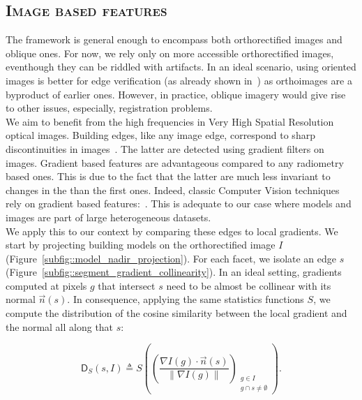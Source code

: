     \subsection{\textsc{Image based features}}
        \label{subsec::learned_evaluation::baseline::image}
        The framework is general enough to encompass both orthorectified images and oblique ones.
        For now, we rely only on more accessible orthorectified images, eventhough they can be riddled with artifacts.
        In an ideal scenario, using oriented images is better for edge verification (as already shown in~\parencite{michelin2013quality}) as orthoimages are a byproduct of earlier ones.
        However, in practice, oblique imagery would give rise to other issues, especially, registration problems.\\

        We aim to benefit from the high frequencies in Very High Spatial Resolution optical images.
        Building edges, like any image edge, correspond to sharp discontinuities in images~\parencite{ortner2007building}.
        The latter are detected using gradient filters on images.
        Gradient based features are advantageous compared to any radiometry based ones.
        This is due to the fact that the latter are much less invariant to changes in the than the first ones.
        Indeed, classic Computer Vision techniques rely on gradient based features:~\textcite{lowe2004distinctive,dalal2005histograms}.
        This is adequate to our case where models and images are part of large heterogeneous datasets.\\
        

        We apply this to our context by comparing these edges to local gradients.
        We start by projecting building models on the orthorectified image $I$ (Figure~\ref{subfig::model_nadir_projection}).
        For each facet, we isolate an edge $s$ (Figure~\ref{subfig::segment_gradient_collinearity}).
        In an ideal setting, gradients computed at pixels $g$ that intersect $s$ need to be almost be collinear with its normal $\vec{n}(s)$.
        In consequence, applying the same statistics functions $S$, we compute the distribution of the cosine similarity between the local gradient and the normal all along that $s$:
        
        \begin{equation}
            \label{eq::corr_seg}
            \mathsf{D}_S(s, I) \triangleq S \left( \left(\frac{\nabla I\left(g\right) \cdot \vec{n}(s)}{\left\rVert \nabla I\left(g\right)\right\rVert}\right)_{\substack{g \in I \\ g \cap s \neq \emptyset}} \right).
        \end{equation}

